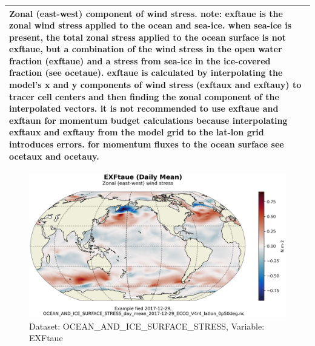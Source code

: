 \begin{longtable}{|m{}|m{}|m{}|m{}|}
\multicolumn{4}{|p{1\textwidth}|}{Zonal (east-west) component of wind stress. note: exftaue is the zonal wind stress applied to the ocean and sea-ice. when sea-ice is present, the total zonal stress applied to the ocean surface is not exftaue, but a combination of the wind stress in the open water fraction (exftaue) and a stress from sea-ice in the ice-covered fraction (see ocetaue). exftaue is calculated by interpolating the model's x and y components of wind stress (exftaux and exftauy) to tracer cell centers and then finding the zonal component of the interpolated vectors. it is not recommended to use exftaue and exftaun for momentum budget calculations because interpolating exftaux and exftauy from the model grid to the lat-lon grid introduces errors. for momentum fluxes to the ocean surface see ocetaux and ocetauy.} \\ \hline
\end{longtable}

\begin{figure}[H]
\centering
\includegraphics[scale=0.55]{../images/plots/latlon_plots/Ocean_and_Sea-Ice_Surface_Stress/EXFtaue.png}
\caption{Dataset: OCEAN\_AND\_ICE\_SURFACE\_STRESS, Variable: EXFtaue}
\label{tab:table-OCEAN_AND_ICE_SURFACE_STRESS_EXFtaue-Plot}
\end{figure}
\pagebreak
